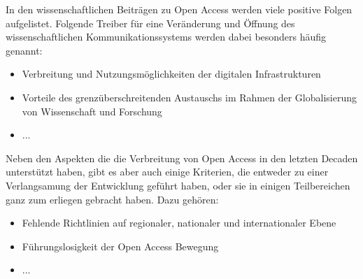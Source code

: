 In den wissenschaftlichen Beiträgen zu Open Access werden viele positive Folgen aufgelistet. Folgende Treiber für eine Veränderung und Öffnung des wissenschaftlichen Kommunikationssystems werden dabei besonders häufig genannt:

\begin{itemize}
\item Verbreitung und Nutzungsmöglichkeiten der digitalen Infrastrukturen
\item Vorteile des grenzüberschreitenden Austauschs im Rahmen der Globalisierung von Wissenschaft und Forschung
\item ...
\end{itemize}

Neben den Aspekten die die Verbreitung von Open Access in den letzten Decaden unterstützt haben, gibt es aber auch einige Kriterien, die entweder zu einer Verlangsamung der Entwicklung geführt haben, oder sie in einigen Teilbereichen ganz zum erliegen gebracht haben. Dazu gehören:

\begin{itemize}
\item Fehlende Richtlinien auf regionaler, nationaler und internationaler Ebene
\item Führungslosigkeit der Open Access Bewegung
\item ...
\end{itemize}


